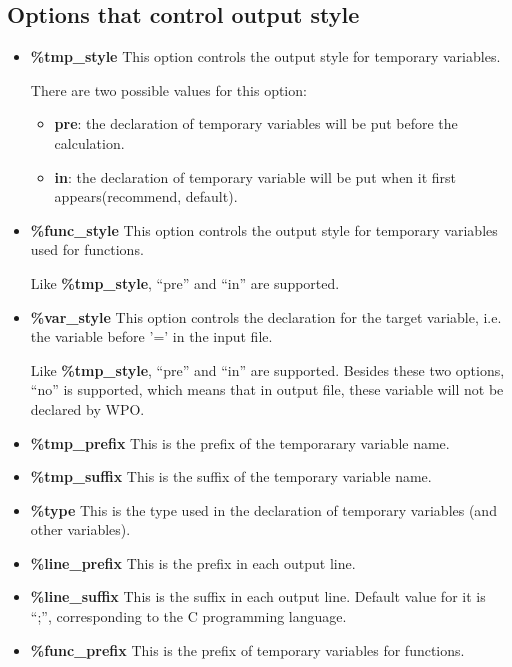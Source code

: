 \documentclass[a4paper]{article}
\begin{document}
\subsection{Options that control output style}
\begin{itemize}
\item \textbf{\%tmp\_style}
This option controls the output style for temporary variables.

There are two possible values for this option:
\begin{itemize}
\item \textbf{pre}: the declaration of temporary variables will be put before the calculation.
\item \textbf{in}: the declaration of temporary variable will be put when it first appears(recommend, default).
\end{itemize}


\item \textbf{\%func\_style}
This option controls the output style for temporary variables used for functions.

Like \textbf{\%tmp\_style}, ``pre'' and ``in'' are supported.

\item \textbf{\%var\_style}
This option controls the declaration for the target variable, i.e. the variable before '=' in the input file.

Like \textbf{\%tmp\_style}, ``pre'' and ``in'' are supported. Besides these two options, ``no'' is supported, which means that in output file, these variable will not be declared by WPO.

\item \textbf{\%tmp\_prefix}
This is the prefix of the temporarary variable name.
\item \textbf{\%tmp\_suffix}
This is the suffix of the temporary variable name.

\item \textbf{\%type}
This is the type used in the declaration of temporary variables (and other variables).

\item \textbf{\%line\_prefix}
This is the prefix in each output line.

\item \textbf{\%line\_suffix}
This is the suffix in each output line. Default value for it is ``;'', corresponding to the C programming language.

\item \textbf{\%func\_prefix}
This is the prefix of temporary variables for functions.

\end{itemize}
\end{document}
